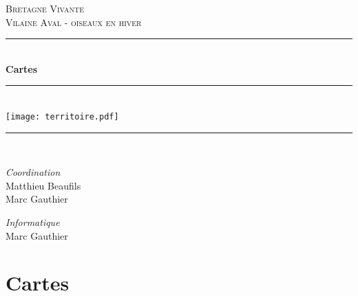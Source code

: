 \documentclass[a4paper,twoside,english]{article}
\newcommand{\monlhead}{Vilaine Aval - oiseaux en hiver}
\newcommand{\HRule}{\rule{\linewidth}{0.5mm}}
\begin{document}
%
\begin{titlepage}
  \begin{sffamily}
  \begin{center}



    \textsc{\LARGE Bretagne Vivante}\\[1cm]
    \textsc{\Large Vilaine Aval - oiseaux en hiver}\\[1cm]

    \HRule \\[0.4cm]
    { \huge \bfseries Cartes}
    \HRule \\[0.4cm]
    \texttt{[image: territoire.pdf]}~\\[.5cm]
    \HRule \\[0.4cm]
    \begin{minipage}{0.4\textwidth}
      \begin{flushleft} \large
        \emph{Coordination}\\
        Matthieu Beaufils\\
         Marc Gauthier
      \end{flushleft}
    \end{minipage}
    \begin{minipage}{0.4\textwidth}
      \begin{flushright} \large
        \emph{Informatique}\\
        Marc Gauthier
      \end{flushright}
    \end{minipage}

    \vfill
  \end{center}
  \end{sffamily}
\end{titlepage}
\setlength{\parskip}{0pt} %
\setlength{\parindent}{0pt}
\renewcommand{\monlhead}{Cartes}
\section{Cartes}

\end{document}

